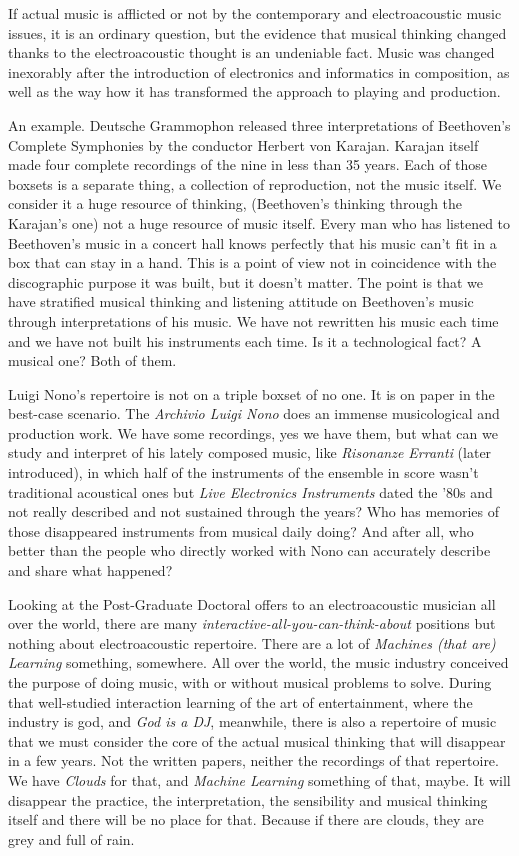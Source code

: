 \documentclass[twoside,a4paper]{article}
\begin{document}
If actual music is afflicted or not by the contemporary and electroacoustic music issues, it is an ordinary question, but the evidence that musical thinking changed thanks to the electroacoustic thought is an undeniable fact. Music was changed inexorably after the introduction of electronics and informatics in composition, as well as the way how it has transformed the approach to playing and production.

An example. Deutsche Grammophon released three interpretations of Beethoven's Complete Symphonies by the conductor Herbert von Karajan. Karajan itself made four complete recordings of the nine in less than 35 years. Each of those boxsets is a separate thing, a collection of reproduction, not the music itself. We consider it a huge resource of thinking, (Beethoven's thinking through the Karajan's one) not a huge resource of music itself. Every man who has listened to Beethoven's music in a concert hall knows perfectly that his music can't fit in a box that can stay in a hand. This is a point of view not in coincidence with the discographic purpose it was built, but it doesn't matter. The point is that we have stratified musical thinking and listening attitude on Beethoven's music through interpretations of his music. We have not rewritten his music each time and we have not built his instruments each time. Is it a technological fact? A musical one? Both of them.

Luigi Nono's repertoire is not on a triple boxset of no one. It is on paper in the best-case scenario. The \emph{Archivio Luigi Nono} does an immense musicological and production work. We have some recordings, yes we have them, but what can we study and interpret of his lately composed music, like \emph{Risonanze Erranti} (later introduced), in which half of the instruments of the ensemble in score wasn't traditional acoustical ones but \emph{Live Electronics Instruments} dated the '80s and not really described and not sustained through the years? Who has memories of those disappeared instruments from musical daily doing? And after all, who better than the people who directly worked with Nono can accurately describe and share what happened?

Looking at the Post-Graduate Doctoral offers to an electroacoustic musician all over the world, there are many \emph{interactive-all-you-can-think-about} positions but nothing about electroacoustic repertoire. There are a lot of \emph{Machines (that are) Learning} something, somewhere. All over the world, the music industry conceived the purpose of doing music, with or without musical problems to solve. During that well-studied interaction learning of the art of entertainment, where the industry is god, and \emph{God is a DJ}, meanwhile, there is also a repertoire of music that we must consider the core of the actual musical thinking that will disappear in a few years. Not the written papers, neither the recordings of that repertoire. We have \emph{Clouds} for that, and \emph{Machine Learning} something of that, maybe. It will disappear the practice, the interpretation, the sensibility and musical thinking itself and there will be no place for that. Because if there are clouds, they are grey and full of rain.
\end{document}
